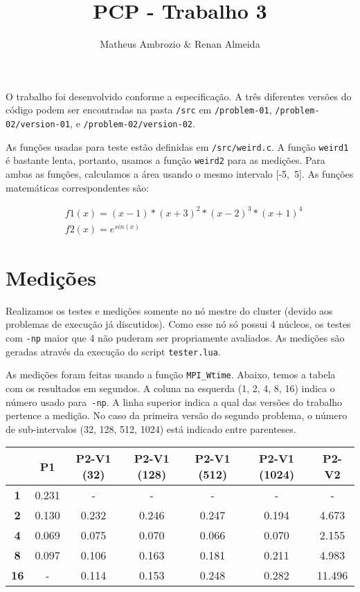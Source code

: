 \documentclass[12pt]{article}
\def\code#1{\texttt{#1}}
\begin{document}
 
\title{PCP - Trabalho 3}
\author{Matheus Ambrozio \& Renan Almeida}
 
\maketitle

O trabalho foi desenvolvido conforme a especificação. A três diferentes versões do código podem ser encontradas na pasta \code{/src} em \code{/problem-01}, \code{/problem-02/version-01}, e \code{/problem-02/version-02}.

As funções usadas para teste estão definidas em \code{/src/weird.c}. A função \code{weird1} é bastante lenta, portanto, usamos a função \code{weird2} para as medições. Para ambas as funções, calculamos a área usando o mesmo intervalo [-5,~5]. As funções matemáticas correspondentes são:

\begin{align}
& f1(x) = (x - 1) * (x + 3)^2 * (x - 2)^3 * (x + 1)^4 \\
& f2(x) = e^{sin(x)}
\end{align}

\section*{Medições}

Realizamos os testes e medições somente no nó mestre do cluster (devido aos problemas de execução já discutidos). Como esse nó só possui 4 núcleos, os testes com \code{-np} maior que 4 não puderam ser propriamente avaliados. As medições são geradas através da execução do script \code{tester.lua}.

As medições foram feitas usando a função \code{MPI\_Wtime}. Abaixo, temos a tabela com os resultados em segundos. A coluna na esquerda (1, 2, 4, 8, 16) indica o número usado para~\code{-np}. A linha superior indica a qual das versões do trabalho pertence a medição. No caso da primeira versão do segundo problema, o número de sub-intervalos (32, 128, 512, 1024) está indicado entre parenteses.

\begin{table}[h]
\begin{tabular}{|c|c|c|c|c|c|c|}
\hline
    { }                     &
    {\textbf{P1}}           &
    {\textbf{P2-V1 (32)}}   &
    {\textbf{P2-V1 (128)}}  &
    {\textbf{P2-V1 (512)}}  &
    {\textbf{P2-V1 (1024)}} &
    {\textbf{P2-V2}}        \\
\hline
{\textbf{1}}  & 0.231   & -     & -     & -     & -     & -      \\ \hline
{\textbf{2}}  & 0.130   & 0.232 & 0.246 & 0.247 & 0.194 & 4.673  \\ \hline
{\textbf{4}}  & 0.069   & 0.075 & 0.070 & 0.066 & 0.070 & 2.155  \\ \hline
{\textbf{8}}  & 0.097   & 0.106 & 0.163 & 0.181 & 0.211 & 4.983  \\ \hline
{\textbf{16}} & -       & 0.114 & 0.153 & 0.248 & 0.282 & 11.496 \\ \hline
\end{tabular}
\end{table}
\end{document}
